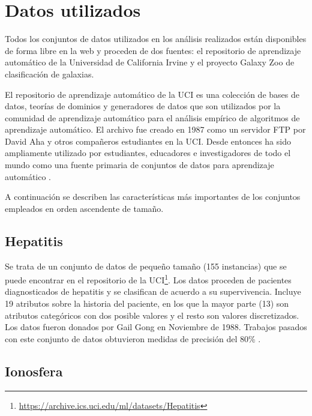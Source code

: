 \section{Datos utilizados}
\label{sec:datasets}

Todos los conjuntos de datos utilizados en los análisis realizados están disponibles de forma libre en la web y proceden de dos fuentes: el repositorio de aprendizaje automático de la Universidad de California Irvine y el proyecto Galaxy Zoo de clasificación de galaxias.

El repositorio de aprendizaje automático de la UCI es una colección de bases de datos, teorías de dominios y generadores de datos que son utilizados por la comunidad de aprendizaje automático para el análisis empírico de algoritmos de aprendizaje automático. El archivo fue creado en 1987 como un servidor FTP por David Aha y otros compañeros estudiantes en la UCI. Desde entonces ha sido ampliamente utilizado por estudiantes, educadores e investigadores de todo el mundo como una fuente primaria de conjuntos de datos para aprendizaje automático \cite{ml-uci}.

A continuación se describen las características más importantes de los conjuntos empleados en orden ascendente de tamaño.

\subsection{Hepatitis}

Se trata de un conjunto de datos de pequeño tamaño (155 instancias) que se puede encontrar en el repositorio de la UCI\footnote{\url{https://archive.ics.uci.edu/ml/datasets/Hepatitis}}. Los datos proceden de pacientes diagnosticados de hepatitis y se clasifican de acuerdo a su supervivencia. Incluye 19 atributos sobre la historia del paciente, en los que la mayor parte (13) son atributos categóricos con dos posible valores y el resto son valores discretizados. Los datos fueron donados por Gail Gong en Noviembre de 1988. Trabajos pasados con este conjunto de datos obtuvieron medidas de precisión del 80\% \cite{hepatitis-gong}.

\subsection{Ionosfera}

